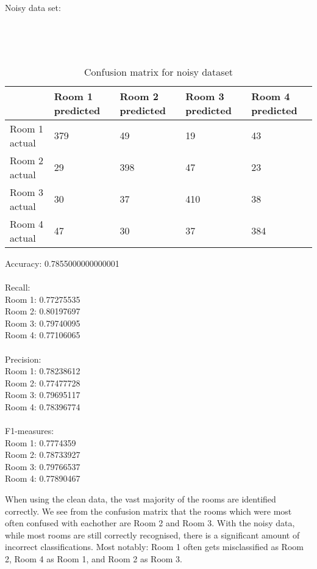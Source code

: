 \documentclass{article}
\begin{document}
\begin{center}
Noisy data set:
\end{center}
  \\

\begin{table}[htb]
  \caption{Confusion matrix for noisy dataset} \\
  \begin{tabular}{|l|l|l|l|l|}
  \hline
                & Room 1 predicted & Room 2 predicted & Room 3 predicted & Room 4 predicted \\ \hline
  Room 1 actual & 379              & 49               & 19               & 43               \\ \hline
  Room 2 actual & 29               & 398              & 47               & 23               \\ \hline
  Room 3 actual & 30               & 37               & 410              & 38               \\ \hline
  Room 4 actual & 47               & 30               & 37               & 384              \\ \hline
  \end{tabular}
\end{table}


Accuracy: 0.7855000000000001 \\
\\
Recall: \\
Room 1: 0.77275535 \\
Room 2: 0.80197697 \\
Room 3: 0.79740095 \\
Room 4: 0.77106065 \\
\\
Precision: \\
Room 1: 0.78238612 \\
Room 2: 0.77477728 \\
Room 3: 0.79695117 \\
Room 4: 0.78396774 \\
\\
F1-measures: \\
Room 1: 0.7774359 \\
Room 2: 0.78733927  \\
Room 3: 0.79766537 \\
Room 4: 0.77890467 \\

\pagebreak


When using the clean data, the vast majority of the rooms are identified
correctly. We see from the confusion matrix that the rooms which were most
often confused with eachother are Room 2 and Room 3. With the noisy data,
while most rooms are still correctly recognised, there is a significant
amount of incorrect classifications. Most notably: Room 1 often gets misclassified as
Room 2, Room 4 as Room 1, and Room 2 as Room 3.
\
\end{document}
